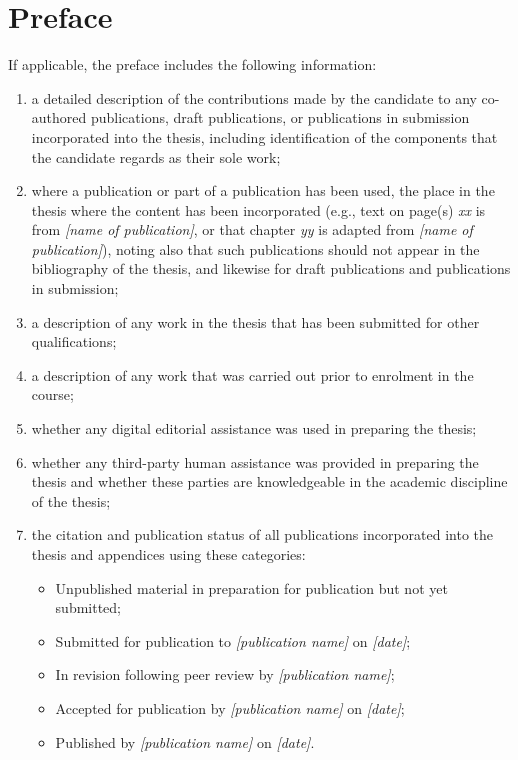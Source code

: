 \chapter*{Preface}


If applicable, the preface includes the following information:

\begin{enumerate}[label=\roman*.]
    \item a detailed description of the contributions made by the candidate to any co-authored publications, draft publications, or publications in submission incorporated into the thesis, including identification of the components that the candidate regards as their sole work;
    
    \item where a publication or part of a publication has been used, the place in the thesis where the content has been incorporated (e.g., text on page(s) \textit{xx} is from \textit{[name of publication]}, or that chapter \textit{yy} is adapted from \textit{[name of publication]}), noting also that such publications should not appear in the bibliography of the thesis, and likewise for draft publications and publications in submission;
    
    \item a description of any work in the thesis that has been submitted for other qualifications;
    
    \item a description of any work that was carried out prior to enrolment in the course;
    
    \item whether any digital editorial assistance was used in preparing the thesis;
    
    \item whether any third-party human assistance was provided in preparing the thesis and whether these parties are knowledgeable in the academic discipline of the thesis;
    
    \item the citation and publication status of all publications incorporated into the thesis and appendices using these categories:
    \begin{itemize}
        \item Unpublished material in preparation for publication but not yet submitted;
        \item Submitted for publication to \textit{[publication name]} on \textit{[date]};
        \item In revision following peer review by \textit{[publication name]};
        \item Accepted for publication by \textit{[publication name]} on \textit{[date]};
        \item Published by \textit{[publication name]} on \textit{[date]}.
    \end{itemize}
\end{enumerate}

